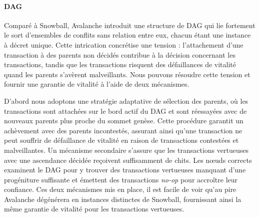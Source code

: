 \documentclass[letterpaper,twocolumn,10pt]{article}
\theoremstyle{definition}
\begin{document}
\paragraph{DAG} Comparé à Snowball, Avalanche introduit une structure de DAG qui lie fortement le sort d'ensembles de conflits sans relation entre eux, chacun étant une instance à décret unique.
Cette intrication concrétise une tension : l'attachement d'une transaction à des parents non décidés contribue à la décision concernant les transactions, tandis que les transactions risquent des défaillances de vitalité quand les parents s'avèrent malveillants.
Nous pouvons résoudre cette tension et fournir une garantie de vitalité à l'aide de deux mécanismes.

D'abord nous adoptons une stratégie adaptative de sélection des parents, où les transactions sont attachées sur le bord actif du DAG et sont réessayées avec de nouveaux parents plus proche du sommet genèse. Cette procédure garantit un achèvement avec des parents incontestés, assurant ainsi qu'une transaction ne peut souffrir de défaillance de vitalité en raison de transactions contestées et malveillantes.
Un mécanisme secondaire s'assure que les transactions vertueuses avec une ascendance décidée reçoivent suffisamment de chits. Les nœuds corrects examinent le DAG pour y trouver des transactions vertueuses manquant d'une progéniture suffisante et émettent des transactions \emph{no-op} pour accroître leur confiance.
Ces deux mécanismes mis en place, il est facile de voir qu'au pire Avalanche dégénérera en instances distinctes de Snowball, fournissant ainsi la même garantie de vitalité pour les transactions vertueuses.
\end{document}
